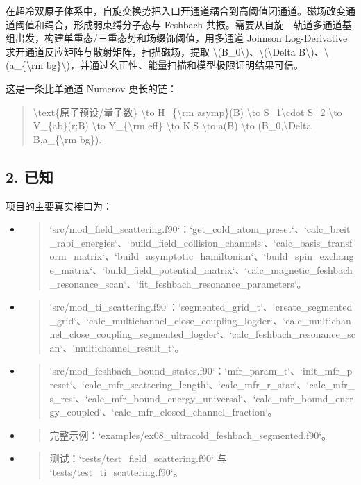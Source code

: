 \documentclass[UTF8,openany,11pt,fontset=fandol]{ctexbook}
\begin{document}
在超冷双原子体系中，自旋交换势把入口开通道耦合到高阈值闭通道。磁场改变通道阈值和耦合，形成弱束缚分子态与
Feshbach
共振。需要从自旋---轨道多通道基组出发，构建单重态/三重态势和场缀饰阈值，用多通道
Johnson Log-Derivative 求开通道反应矩阵与散射矩阵，扫描磁场，提取
\textbackslash(B\_0\textbackslash)、\textbackslash(\textbackslash Delta
B\textbackslash)、\textbackslash(a\_\{\textbackslash rm
bg\}\textbackslash)，并通过幺正性、能量扫描和模型极限证明结果可信。

这是一条比单通道 Numerov 更长的链：

\begin{quote}
\textbackslash text\{原子预设/量子数\} \textbackslash to
H\_\{\textbackslash rm asymp\}(B) \textbackslash to
S\_1\textbackslash cdot S\_2 \textbackslash to V\_\{ab\}(r;B)
\textbackslash to Y\_\{\textbackslash rm eff\} \textbackslash to K,S
\textbackslash to a(B) \textbackslash to (B\_0,\textbackslash Delta
B,a\_\{\textbackslash rm bg\}).
\end{quote}

\subsection{\texorpdfstring{\textbf{2.
已知}}{2. 已知}}\label{ux5df2ux77e5-2}

项目的主要真实接口为：

\begin{itemize}
\item
  \begin{quote}
  `src/mod\_field\_scattering.f90`：`get\_cold\_atom\_preset`、`calc\_breit\_rabi\_energies`、`build\_field\_collision\_channels`、`calc\_basis\_transform\_matrix`、`build\_asymptotic\_hamiltonian`、`build\_spin\_exchange\_matrix`、`build\_field\_potential\_matrix`、`calc\_magnetic\_feshbach\_resonance\_scan`、`fit\_feshbach\_resonance\_parameters`。
  \end{quote}
\item
  \begin{quote}
  `src/mod\_ti\_scattering.f90`：`segmented\_grid\_t`、`create\_segmented\_grid`、`calc\_multichannel\_close\_coupling\_logder`、`calc\_multichannel\_close\_coupling\_segmented\_logder`、`calc\_feshbach\_resonance\_scan`、`multichannel\_result\_t`。
  \end{quote}
\item
  \begin{quote}
  `src/mod\_feshbach\_bound\_states.f90`：`mfr\_param\_t`、`init\_mfr\_preset`、`calc\_mfr\_scattering\_length`、`calc\_mfr\_r\_star`、`calc\_mfr\_s\_res`、`calc\_mfr\_bound\_energy\_universal`、`calc\_mfr\_bound\_energy\_coupled`、`calc\_mfr\_closed\_channel\_fraction`。
  \end{quote}
\item
  \begin{quote}
  完整示例：`examples/ex08\_ultracold\_feshbach\_segmented.f90`。
  \end{quote}
\item
  \begin{quote}
  测试：`tests/test\_field\_scattering.f90` 与
  `tests/test\_ti\_scattering.f90`。
  \end{quote}
\end{itemize}
\end{document}
